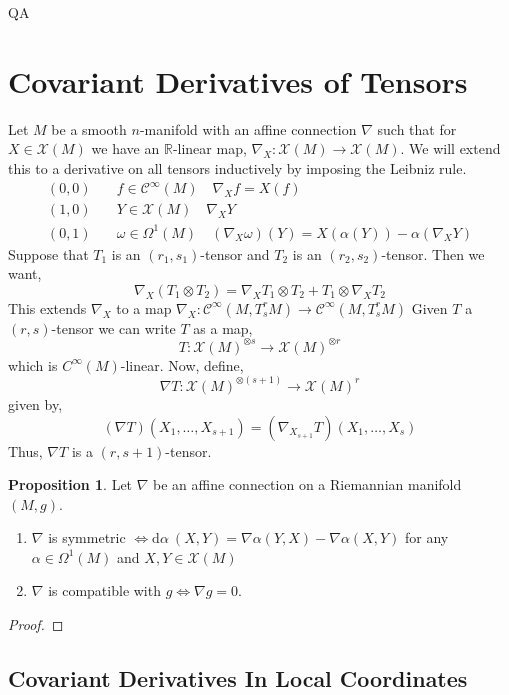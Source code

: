 QA	 \documentclass[12pt]{extarticle}
\newcommand{\R}{\mathbb{R}}
\renewcommand{\d}[1]{ \mathrm{d}#1 \:}
\theoremstyle{definition}
\newtheorem{proposition}[theorem]{Proposition}
\newcommand{\C}[1]{\mathcal{C}^{#1}}
\begin{document}
\section{Covariant Derivatives of Tensors}

Let $M$ be a smooth $n$-manifold with an affine connection $\nabla$ such that for $X \in \mathscr{X}(M)$ we have an $\R$-linear map, $\nabla_X : \mathscr{X}(M) \to \mathscr{X}(M)$. 
We will extend this to a derivative on all tensors inductively by imposing the Leibniz rule.
\begin{align*}
(0,0) \quad & f \in \C{\infty}(M) \quad \nabla_X f = X(f) 
\\
(1, 0) \quad & Y \in \mathscr{X}(M) \quad \nabla_X Y
\\
(0, 1) \quad & \omega \in \Omega^1(M) \quad (\nabla_X \omega)(Y) = X(\alpha(Y)) - \alpha(\nabla_X Y)
\end{align*} 
Suppose that $T_1$ is an $(r_1, s_1)$-tensor and $T_2$ is an $(r_2, s_2)$-tensor. Then we want,
\[ \nabla_X (T_1 \otimes T_2) = \nabla_X T_1 \otimes T_2 + T_1 \otimes \nabla_X T_2 \]
This extends $\nabla_X$ to a map $\nabla_X : \C{\infty}(M, T^{r}_s M) \to \C{\infty}(M, T^r_s M)$ 
Given $T$ a $(r, s)$-tensor we can write $T$ as a map,
\[ T : \mathscr{X}(M)^{\otimes s} \to \mathscr{X}(M)^{\otimes r} \]
which is $C^{\infty}(M)$-linear. Now, define,
\[ \nabla T : \mathscr{X}(M)^{\otimes (s + 1)} \to \mathscr{X}(M)^{r} \]
given by,
\[ (\nabla T)(X_1, \dots, X_{s+1}) = (\nabla_{X_{s+1}} T)(X_1, \dots, X_s) \]
Thus, $\nabla T$ is a $(r, s + 1)$-tensor. 

\begin{proposition}
Let $\nabla$ be an affine connection on a Riemannian manifold $(M, g)$.
\begin{enumerate}
\item $\nabla$ is symmetric $\iff \d{\alpha}(X, Y) = \nabla \alpha(Y, X) - \nabla \alpha(X, Y)$ for any $\alpha \in \Omega^1(M)$ and $X,Y \in \mathscr{X}(M)$
\item $\nabla$ is compatible with $g \iff \nabla g = 0$.
\end{enumerate}
\end{proposition}

\begin{proof}

\end{proof}

\subsection{Covariant Derivatives In Local Coordinates}
\end{document}
